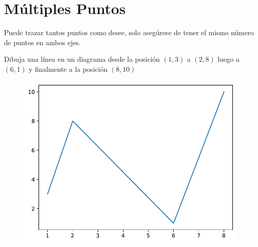 \section{Múltiples Puntos}

Puede trazar tantos puntos como desee, solo asegúrese de tener el mismo
número de puntos en ambos ejes. \\

\begin{code} Dibuja una línea en un diagrama desde la posición
\((1, 3)\) a \((2, 8)\) luego a \((6, 1)\) y finalmente a la posición
\((8, 10)\)

\begin{Shaded}
\begin{Highlighting}[]

\OperatorTok{=}\NormalTok{ np.array([}\NormalTok{, }\NormalTok{, }\NormalTok{, }\NormalTok{])}
\OperatorTok{=}\NormalTok{ np.array([}\NormalTok{, }\NormalTok{, }\NormalTok{, }\NormalTok{])}

\end{Highlighting}
\end{Shaded}

\begin{figure}
  \centering
  \includegraphics[scale=0.6]{img/grafica1004.pdf}
\end{figure}
\end{code}

